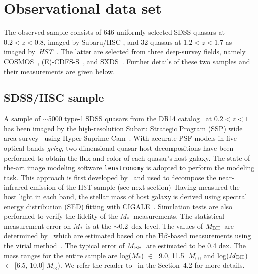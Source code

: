 \documentclass[twocolumn]{aastex631}
\def\smass{{$M_*$}}
\def\hbeta{${\rm H}\beta$}
\def\mbh{$M_{\rm BH}$}
\def\hst{{\it HST}}
\begin{document}
\section{Observational data set}
\label{sec:observations}
The observed sample consists of 646 uniformly-selected SDSS quasars at $0.2<z<0.8$, imaged by Subaru/HSC \citep{Li2021a}, and 32 quasars at $1.2<z<1.7$ as imaged by~\hst~\citep[][hereafter D20]{Ding2020}. The latter are selected from three deep-survey fields, namely COSMOS~\citep{Civano2016}, (E)-CDFS-S~\citep{Lehmer2005, Xue2011}, and SXDS~\citep{Ueda2008}. Further details of these two samples and their measurements are given below. 

\subsection{SDSS/HSC sample}\label{sec:hsc}
A sample of $\sim$5000 type-1 SDSS quasars from the DR14 catalog~\citep{Paris2018} at $0.2<z<1$ has been imaged by the high-resolution Subaru Strategic Program (SSP) wide area survey~\citep{Aihara2019} using Hyper Suprime-Cam~\citep{Miyazaki2018}. With accurate PSF models in five optical bands {\it grizy}, two-dimensional quasar-host decompositions have been performed \citep[][]{Li2021a} to obtain the flux and color of each quasar's host galaxy. The state-of-the-art image modeling software {\tt lenstronomy} \citep{Birrer2015, Birrer2018, Birrer2021} is adopted to perform the modeling task. This approach is first developed by~\citet{Ding2020} and used to decompose the near-infrared emission of the HST sample (see next section). Having measured the host light in each band, the stellar mass of host galaxy is derived using spectral energy distribution (SED) fitting with CIGALE~\citep{Boquien2019}. Simulation tests are also performed to verify the fidelity of the \smass\ measurements. The statistical measurement error on \smass\ is at the $\sim$0.2~dex level. The values of \mbh\ are determined by~\citet{Rakshit2020} which are estimated based on the \hbeta-based measurements using the virial method~\citep{Peterson2004, Vestergaard2006}. The typical error of \mbh\ are estimated to be 0.4 dex. The mass ranges for the entire sample are log(\smass) $\in$ [9.0, 11.5] $M_{\odot}$, and log(\mbh) $\in$  [6.5, 10.0] $M_{\odot}$).
 We refer the reader to~\citet{Li2021a} in the Section~4.2 for more details.
\end{document}
